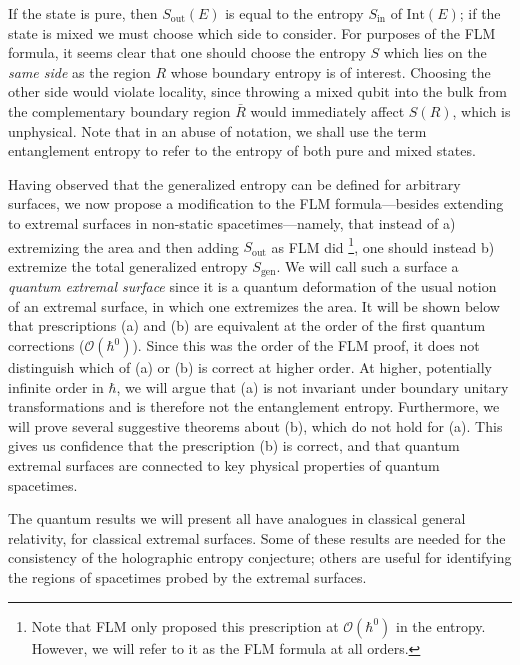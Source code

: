 \documentclass[12pt]{article}
\theoremstyle{remark}
\newcommand{\netta}[1]{{\color{red}#1}}
\newcommand{\aw}[1]{{\color{blue}#1}}
\numberwithin{equation}{section}
\numberwithin{equation}{section}
\begin{document}
If the state is pure, then $S_\mathrm{out}(E)$ is equal to the entropy $S_\mathrm{in}$ of $\mathrm{Int}(E) $; if the state is mixed we must choose which side to consider.  For purposes of the FLM formula, it seems clear that one should choose the entropy $S$ which lies on the \emph{same side} as the region $R$ whose boundary entropy is of interest.  Choosing the other side would violate locality, since throwing a mixed qubit into the bulk from the complementary boundary region $\bar{R}$ would immediately affect $S(R)$, which is unphysical. Note that in an abuse of notation, we shall use the term entanglement entropy to refer to the entropy of both pure and mixed states.

Having observed that the generalized entropy can be defined for arbitrary surfaces, we now propose a modification to the FLM formula---besides extending to extremal surfaces in non-static spacetimes---namely, that instead of a) extremizing the area and then adding $S_\mathrm{out}$ as FLM did  \footnote{Note that FLM only proposed this prescription at $\mathcal{O}(\hbar^{0})$ in the entropy. However, we will refer to it as the FLM formula at all orders.}, one should instead b) extremize the total generalized entropy $S_\mathrm{gen}$.  We will call such a surface a \emph{quantum extremal surface} since it is a quantum deformation of the usual notion of an extremal surface, in which one extremizes the area.  It will be shown below that prescriptions (a) and (b) are equivalent at the order of the first quantum corrections ($\mathcal{O}(\hbar^{0})$).  Since this was the order of the FLM proof, it does not distinguish which of (a) or (b) is correct at higher order.  At higher, potentially infinite order in $\hbar$, we will argue that (a) is not invariant under boundary unitary transformations and is therefore not the entanglement entropy.  
Furthermore, we will prove several suggestive theorems about (b), which do not hold for (a).  This gives us confidence that the prescription (b) is correct, and that quantum extremal surfaces are connected to key physical properties of quantum spacetimes.

The quantum results we will present all have analogues in classical general relativity, for classical extremal surfaces.  Some of these results are needed for the consistency of the holographic entropy conjecture; others are useful for identifying the regions of spacetimes probed by the extremal surfaces.
\end{document}
